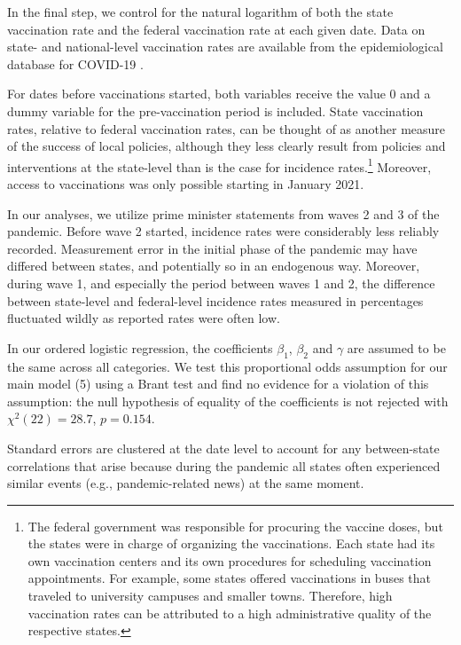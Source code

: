 \documentclass[12pt, abstract=true]{scrartcl}
\begin{document}
In the final step, we control for the natural logarithm of both the state vaccination rate and the federal vaccination rate at each given date. Data on state- and national-level vaccination rates are available from the epidemiological database for COVID-19 \citep{Guidotti2022}. 

For dates before vaccinations started, both variables receive the value $0$ and a dummy variable for the pre-vaccination period is included. State vaccination rates, relative to federal vaccination rates, can be thought of as another measure of the success of local policies, although they less clearly result from policies and interventions at the state-level than is the case for incidence rates.\footnote{
	The federal government was responsible for procuring the vaccine doses, but the states were in charge of organizing the vaccinations. Each state had its own vaccination centers and its own procedures for scheduling vaccination appointments. For example, some states offered vaccinations in buses that traveled to university campuses and smaller towns. Therefore, high vaccination rates can be attributed to a high administrative quality of the respective states.
} Moreover, access to vaccinations was only possible starting in January 2021.  

In our analyses, we utilize prime minister statements from waves 2 and 3 of the pandemic. Before wave 2 started, incidence rates were considerably less reliably recorded. Measurement error in the initial phase of the pandemic may have differed between states, and potentially so in an endogenous way. Moreover, during wave 1, and especially the period between waves 1 and 2, the difference between state-level and federal-level incidence rates measured in percentages fluctuated wildly as reported rates were often low.

In our ordered logistic regression, the coefficients $\beta_1$, $\beta_2$ and $\gamma$ are assumed to be the same across all categories. We test this proportional odds assumption for our main model (5) using a Brant test \citep{Brant1990} and find no evidence for a violation of this assumption: the null hypothesis of equality of the coefficients is not rejected with $\chi^2 (22) = 28.7$, $p = 0.154$. 

Standard errors are clustered at the date level to account for any between-state correlations that arise because during the pandemic all states often experienced similar events (e.g., pandemic-related news) at the same moment.  
\end{document}
